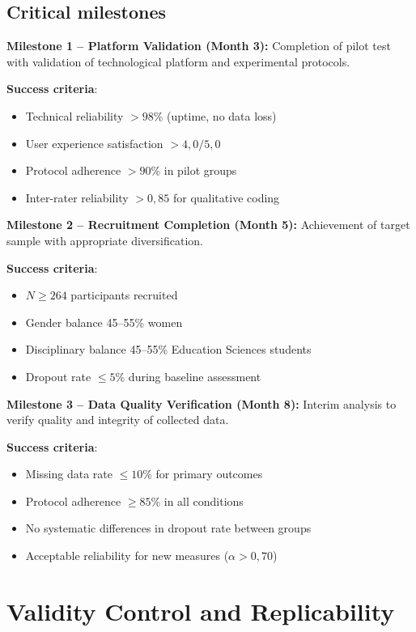 \subsection{Critical milestones}

\textbf{Milestone 1 -- Platform Validation (Month 3):} Completion of pilot test with validation of technological platform and experimental protocols.

\textbf{Success criteria}:
\begin{itemize}
	\item Technical reliability $> 98$\% (uptime, no data loss)
	\item User experience satisfaction $> 4{,}0/5{,}0$
	\item Protocol adherence $> 90$\% in pilot groups
	\item Inter-rater reliability $> 0{,}85$ for qualitative coding
\end{itemize}

\textbf{Milestone 2 -- Recruitment Completion (Month 5):} Achievement of target sample with appropriate diversification.

\textbf{Success criteria}:
\begin{itemize}
	\item $N \geq 264$ participants recruited
	\item Gender balance 45--55\% women
	\item Disciplinary balance 45--55\% Education Sciences students
	\item Dropout rate $\leq 5$\% during baseline assessment
\end{itemize}

\textbf{Milestone 3 -- Data Quality Verification (Month 8):} Interim analysis to verify quality and integrity of collected data.

\textbf{Success criteria}:
\begin{itemize}
	\item Missing data rate $\leq 10$\% for primary outcomes
	\item Protocol adherence $\geq 85$\% in all conditions
	\item No systematic differences in dropout rate between groups
	\item Acceptable reliability for new measures ($\alpha > 0{,}70$)
\end{itemize}

\newpage

\section{Validity Control and Replicability}
